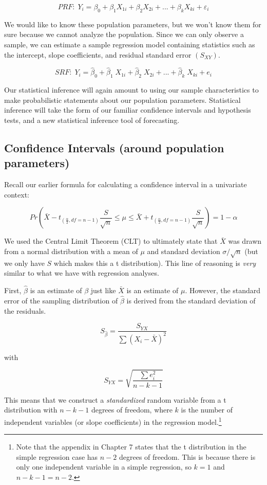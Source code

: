 \documentclass[
]{book}
\begin{document}
\[PRF:\;Y_i=\beta_0+\beta_1X_{1i}+\beta_2X_{2i}+...+\beta_kX_{ki}+\varepsilon_i\]

We would like to know these population parameters, but we won't know them for sure because we cannot analyze the population. Since we can only observe a sample, we can estimate a sample regression model containing statistics such as the intercept, slope coefficients, and residual standard error \((S_{XY})\).

\[SRF:\;Y_i=\hat{\beta}_0+\hat{\beta}_1\;X_{1i}+\hat{\beta}_2\;X_{2i}+...+\hat{\beta}_k\;X_{ki}+e_i\]

Our statistical inference will again amount to using our sample characteristics to make probabilistic statements about our population parameters. Statistical inference will take the form of our familiar confidence intervals and hypothesis tests, and a new statistical inference tool of forecasting.

\hypertarget{confidence-intervals-around-population-parameters-1}{%
\subsection{Confidence Intervals (around population parameters)}\label{confidence-intervals-around-population-parameters-1}}

Recall our earlier formula for calculating a confidence interval in a univariate context:

\[Pr\left(\bar{X}-t_{(\frac{\alpha}{2},df=n-1)}\frac{S}{\sqrt{n}} \leq \mu \leq \bar{X}+t_{(\frac{\alpha}{2},df=n-1)}\frac{S}{\sqrt{n}}\right)=1-\alpha\]

We used the Central Limit Theorem (CLT) to ultimately state that \(\bar{X}\) was drawn from a normal distribution with a mean of \(\mu\) and standard deviation \(\sigma/\sqrt{n}\) (but we only have \(S\) which makes this a t distribution). This line of reasoning is \emph{very} similar to what we have with regression analyses.

First, \(\hat{\beta}\) is an estimate of \(\beta\) just like \(\bar{X}\) is an estimate of \(\mu\). However, the standard error of the sampling distribution of \(\hat{\beta}\) is derived from the standard deviation of the residuals.

\[S_{\hat{\beta}}=\frac{S_{YX}}{\sum{(X_i-\bar{X})^2}}\]

with

\[S_{YX} = \sqrt{ \frac{\sum e_i^2}{n-k-1} }\]

This means that we construct a \emph{standardized} random variable from a t distribution with \(n-k-1\) degrees of freedom, where \(k\) is the number of independent variables (or slope coefficients) in the regression model.\footnote{Note that the appendix in Chapter 7 states that the t distribution in the simple regression case has \(n-2\) degrees of freedom. This is because there is only one independent variable in a simple regression, so \(k=1\) and \(n-k-1 = n - 2\).}
\end{document}
